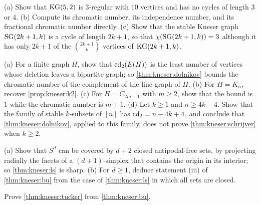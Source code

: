 \begin{refsection}
\begin{exercises}
\item \consolidation\label{ex:kneser:petersen} (a) Show that $\mathrm{KG}(5,2)$ is $3$-regular with $10$ vertices and has no cycles of length $3$ or $4$. (b) Compute its chromatic number, its independence number, and its fractional chromatic number directly. (c) Show that the stable Kneser graph $\mathrm{SG}(2k+1,k)$ is a cycle of length $2k+1$, so that $\chi(\mathrm{SG}(2k+1,k))=3$ although it has only $2k+1$ of the $\binom{2k+1}{k}$ vertices of $\mathrm{KG}(2k+1,k)$.

\item \consolidation\label{ex:kneser:dolnikov} (a) For a finite graph $H$, show that $\mathrm{cd}_2(E(H))$ is the least number of vertices whose deletion leaves a bipartite graph; so \cref{thm:kneser:dolnikov} bounds the chromatic number of the complement of the line graph of $H$. (b) For $H=K_n$, recover \cref{prop:kneser:k2}. (c) For $H=C_{2m+1}$ with $m\ge2$, show that the bound is $1$ while the chromatic number is $m+1$. (d) Let $k\ge1$ and $n\ge4k-4$. Show that the family of stable $k$-subsets of $[n]$ has $\mathrm{cd}_2=n-4k+4$, and conclude that \cref{thm:kneser:dolnikov}, applied to this family, does not prove \cref{thm:kneser:schrijver} when $k\ge2$.

\item \consolidation\label{ex:kneser:lsbu} (a) Show that $S^d$ can be covered by $d+2$ closed antipodal-free sets, by projecting radially the facets of a $(d+1)$-simplex that contains the origin in its interior; so \cref{thm:kneser:ls} is sharp. (b) For $d\ge1$, deduce statement (iii) of \cref{thm:kneser:bu} from the case of \cref{thm:kneser:ls} in which all sets are closed.

\item \consolidation\hard\label{ex:kneser:tucker} Prove \cref{thm:kneser:tucker} from \cref{thm:kneser:bu}. 


\end{exercises}
\end{refsection}
